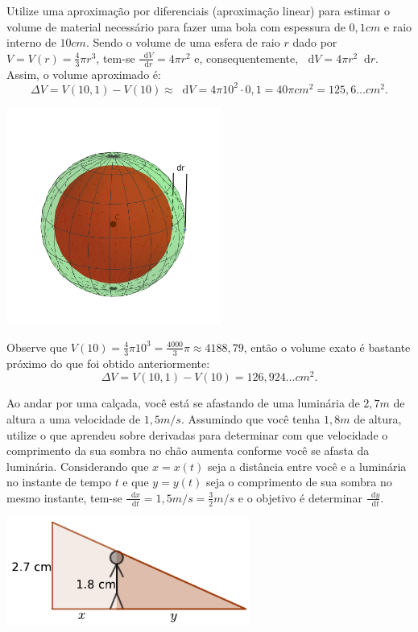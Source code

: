 \documentclass[12pt,a4paper]{article}
\newcommand*\diff{\mathop{}\!\mathrm{d}}
\begin{document}
\begin{ExerciseList}
\Exercise[title={2,0}] Utilize uma aproximação por diferenciais (aproximação linear) para estimar o volume de material necessário para fazer uma bola com espessura de $0,1 cm$ e raio interno de $10 cm$.
\Answer Sendo o volume de uma esfera de raio $r$ dado por $V = V(r) = \frac{4}{3} \pi r^3$, tem-se
$\frac{\diff V}{\diff r} = 4 \pi r^2$ e,  consequentemente, $\diff V = 4 \pi r^2 \diff r$. Assim, o volume aproximado é:
\[
\Delta V = V(10,1) - V(10) \approx \diff V = 4 \pi 10^2 \cdot 0,1 = 40 \pi cm^2 = 125,6\ldots cm^2.
\]
\begin{center}
\includegraphics[width=7cm]{img/prova-2-tads-esfera.png}
\end{center}
Observe que $V(10) = \frac{4}{3} \pi 10^3 = \frac{4000}{3} \pi \approx 4188,79$, então o volume exato é bastante próximo do que foi obtido anteriormente:
\[
\Delta V = V(10,1) - V(10) =126,924\ldots cm^2.
\]


\Exercise[title={2,0}] Ao andar por uma calçada, você está se afastando de uma luminária de $2,7m$ de altura a uma velocidade de $1,5 m/s$. Assumindo que você tenha $1,8m$ de altura, utilize o que aprendeu sobre derivadas para determinar com que velocidade o comprimento da sua sombra no chão aumenta conforme você se afasta da luminária.
\Answer Considerando que $x = x(t)$ seja a distância entre você e a luminária no instante de tempo $t$ e que $y = y(t)$ seja o comprimento de sua sombra no mesmo instante, tem-se $\frac{\diff x}{\diff t} = 1,5 m/s = \frac{3}{2} m/s$ e o objetivo é determinar $\frac{\diff y}{\diff t}$.
\begin{center}
\includegraphics[width=8cm]{img/prova-2-tads-sombra.pdf}
\end{center}


\end{ExerciseList}
\end{document}
